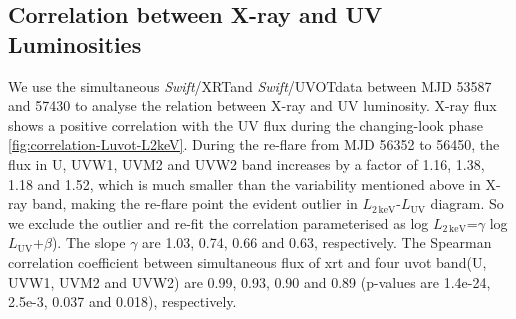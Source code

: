 \documentclass[twocolumn]{aastex63}
\newcommand{\xrt}{{\small {\it Swift}/XRT}}
\newcommand{\uvot}{{\small {\it Swift}/UVOT}}
\begin{document}
\subsection{Correlation between X-ray and UV Luminosities}\label{subsec:xray-uv}
We use the simultaneous \xrt and \uvot data between MJD 53587 and 57430 to analyse the relation between X-ray and UV luminosity. X-ray flux shows a positive correlation with the UV flux during the changing-look phase \autoref{fig:correlation-Luvot-L2keV}. During the re-flare from MJD 56352 to 56450, the flux in U, UVW1, UVM2 and UVW2 band increases by a factor of 1.16, 1.38, 1.18 and 1.52, which is much smaller than the variability mentioned above in X-ray band, making the re-flare point the evident outlier in $L_\mathrm{{2\,keV}}$-$L_\mathrm{{UV}}$ diagram. So we exclude the outlier and re-fit the correlation parameterised as log $ L_\mathrm{{2\,keV}}$=$\gamma$ log $ L_\mathrm{{UV}}$+$\beta$). The slope $\gamma$ are 1.03, 0.74, 0.66 and 0.63, respectively.  The Spearman correlation coefficient between simultaneous flux of xrt and four uvot band(U, UVW1, UVM2 and UVW2) are 0.99, 0.93, 0.90 and 0.89 (p-values are 1.4e-24, 2.5e-3, 0.037 and 0.018), respectively. 
\end{document}
